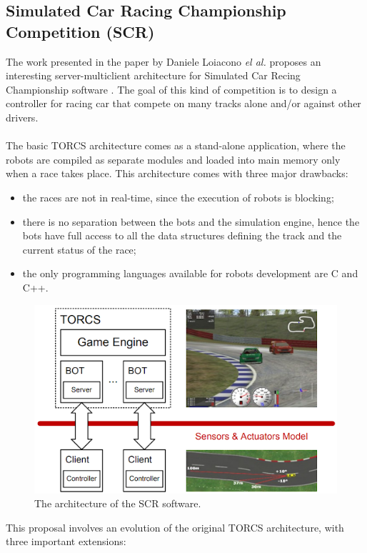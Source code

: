 \subsection{Simulated Car Racing Championship Competition (SCR)}\label{scr}
The work presented in the paper by Daniele Loiacono \textit{el al.} proposes an interesting server-multiclient architecture for Simulated Car Recing Championship software \cite{womak:scr-manual}. The goal of this kind of competition is to design a controller for racing car that compete on many tracks alone and/or against other drivers. \\ \\
The basic TORCS architecture comes as a stand-alone application, where the robots are compiled as separate modules and loaded into main memory only when a race takes place. This architecture comes with three major drawbacks:
\begin{itemize}
	\item the races are not in real-time, since the execution of robots is blocking;
	\item there is no separation between the bots and the simulation engine, hence the bots have full access to all the data structures defining the track and the current status of the race;
	\item the only programming languages available for robots development are C and C++.
\end{itemize}
\begin{figure}[h!]
	\centering
	\includegraphics[width=0.75\linewidth]{"immagini/Feasibility study/SCR-architecture"}
	\caption[The architecture of the SCR software.]{The architecture of the SCR software.}
	\label{fig:scr-architecture}
\end{figure}
This proposal involves an evolution of the original TORCS architecture, with three important extensions:
